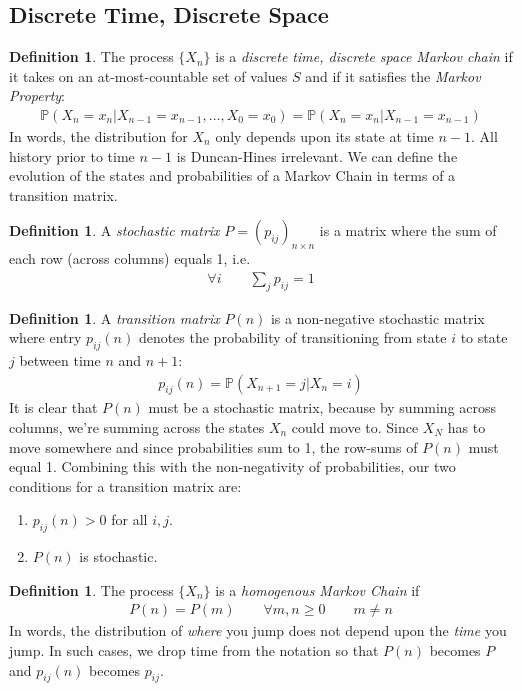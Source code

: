 \documentclass[12pt]{article}
\theoremstyle{plain}
\theoremstyle{definition}
\newtheorem{defn}[thm]{Definition}
\theoremstyle{remark}
\begin{document}
\subsection{Discrete Time, Discrete Space}

\begin{defn}
The process $\{X_n\}$ is a \emph{discrete time, discrete space Markov chain} if it takes on an at-most-countable set of values $S$ and if it
satisfies the \emph{Markov Property}:
\begin{align*}
  \mathbb{P}(X_n = x_n | X_{n-1}=x_{n-1}, \ldots, X_0 =x_0)
  =\mathbb{P}(X_n = x_n | X_{n-1}=x_{n-1})
\end{align*}
In words, the distribution for $X_{n}$ only depends upon its state at
time $n-1$. All history prior to time $n-1$ is Duncan-Hines irrelevant.
We can define the evolution of the states and probabilities of a Markov
Chain in terms of a transition matrix.
\end{defn}

\begin{defn}
A \emph{stochastic matrix} $P=(p_{ij})_{n\times n}$ is a matrix where
the sum of each row (across columns) equals 1, i.e.
\begin{align*}
  \forall i \qquad \sum_j p_{ij} = 1
\end{align*}
\end{defn}

\begin{defn}
A \emph{transition matrix} $P(n)$ is a non-negative stochastic matrix
where entry $p_{ij}(n)$ denotes the probability of
transitioning from state $i$ to state $j$ between time $n$ and $n+1$:
\begin{align*}
  p_{ij}(n) = \mathbb{P}(X_{n+1}=j | X_n=i)
\end{align*}
It is clear that $P(n)$ must be a stochastic matrix, because by summing
across columns, we're summing across the states $X_n$ could move to.
Since $X_N$ has to move somewhere and since probabilities sum to 1, the
row-sums of $P(n)$ must equal 1. Combining this with the non-negativity
of probabilities, our two conditions for a transition matrix are:
\begin{enumerate}
  \item $p_{ij}(n)>0$ for all $i,j$.
  \item $P(n)$ is stochastic.
\end{enumerate}
\end{defn}

\begin{defn}
The process $\{X_n\}$ is a \emph{homogenous Markov Chain} if
\begin{align*}
  P(n) = P(m) \qquad \forall m,n\geq 0 \qquad m\neq n
\end{align*}
In words, the distribution of \emph{where} you jump does not depend upon
the \emph{time} you jump. In such cases, we drop time from the notation
so that $P(n)$ becomes $P$ and $p_{ij}(n)$ becomes $p_{ij}$.
\end{defn}
\end{document}
